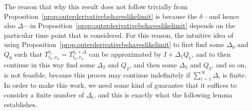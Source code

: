 \documentclass[10pt,a4paper]{paper}
\theoremstyle{definition}
\begin{document}
The reason that why this result does not follow trivially from Proposition~\ref{prop:outerderivativebehaveslikelimit} is because the $\delta$---and hence also $\Delta$---in Proposition~\ref{prop:outerderivativebehaveslikelimit} depends on the particular time point that is considered. For this reason, the intuitive idea of using Proposition~\ref{prop:outerderivativebehaveslikelimit} to first find some $\Delta_0$ and $Q_0$ such that $T_{t_0,x_u}^{t_1}=T_{t_0,x_u}^{t_0+\Delta}$ can be approximated by $I+\Delta_1Q_1$, and to then continue in this way find some $\Delta_2$ and $Q_2$, and then some $\Delta_3$ and $Q_3$, and so on, is not feasible, because this proces may continue indefinitely if $\sum_{i=1}^\infty\Delta_i$ is finite. In order to make this work, we need some kind of guarantee that it suffices to consider a finite number of $\Delta_i$, and this is exactly what the following lemma establishes.
\end{document}
